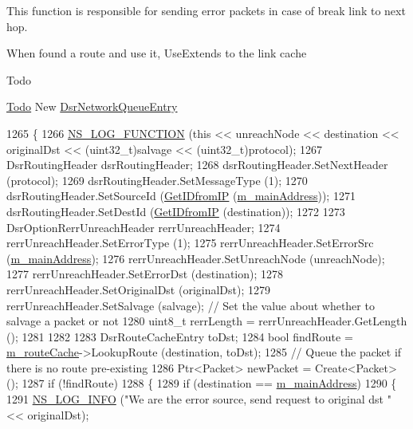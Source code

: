 This function is responsible for sending error packets in case of break link to next hop. 

When found a route and use it, Use\+Extends to the link cache

\begin{DoxyRefDesc}{Todo}
\item[\hyperlink{todo__todo000023}{Todo}]New \hyperlink{classns3_1_1dsr_1_1DsrNetworkQueueEntry}{Dsr\+Network\+Queue\+Entry} \end{DoxyRefDesc}

\begin{DoxyCode}
1265 \{
1266   \hyperlink{log-macros-disabled_8h_a90b90d5bad1f39cb1b64923ea94c0761}{NS\_LOG\_FUNCTION} (\textcolor{keyword}{this} << unreachNode << destination << originalDst << (uint32\_t)salvage <<
       (uint32\_t)protocol);
1267   DsrRoutingHeader dsrRoutingHeader;
1268   dsrRoutingHeader.SetNextHeader (protocol);
1269   dsrRoutingHeader.SetMessageType (1);
1270   dsrRoutingHeader.SetSourceId (\hyperlink{classns3_1_1dsr_1_1DsrRouting_a4593e50d5f36e9b9b013fe0422067c44}{GetIDfromIP} (\hyperlink{classns3_1_1dsr_1_1DsrRouting_a73182b5edee2d8460f28855e058fc9a0}{m\_mainAddress}));
1271   dsrRoutingHeader.SetDestId (\hyperlink{classns3_1_1dsr_1_1DsrRouting_a4593e50d5f36e9b9b013fe0422067c44}{GetIDfromIP} (destination));
1272 
1273   DsrOptionRerrUnreachHeader rerrUnreachHeader;
1274   rerrUnreachHeader.SetErrorType (1);
1275   rerrUnreachHeader.SetErrorSrc (\hyperlink{classns3_1_1dsr_1_1DsrRouting_a73182b5edee2d8460f28855e058fc9a0}{m\_mainAddress});
1276   rerrUnreachHeader.SetUnreachNode (unreachNode);
1277   rerrUnreachHeader.SetErrorDst (destination);
1278   rerrUnreachHeader.SetOriginalDst (originalDst);
1279   rerrUnreachHeader.SetSalvage (salvage);                       \textcolor{comment}{// Set the value about whether to salvage a
       packet or not}
1280   uint8\_t rerrLength = rerrUnreachHeader.GetLength ();
1281 
1282 
1283   DsrRouteCacheEntry toDst;
1284   \textcolor{keywordtype}{bool} findRoute = \hyperlink{classns3_1_1dsr_1_1DsrRouting_ac409bdb961b9fff0fb63ebd026be99ad}{m\_routeCache}->LookupRoute (destination, toDst);
1285   \textcolor{comment}{// Queue the packet if there is no route pre-existing}
1286   Ptr<Packet> newPacket = Create<Packet> ();
1287   \textcolor{keywordflow}{if} (!findRoute)
1288     \{
1289       \textcolor{keywordflow}{if} (destination == \hyperlink{classns3_1_1dsr_1_1DsrRouting_a73182b5edee2d8460f28855e058fc9a0}{m\_mainAddress})
1290       \{
1291         \hyperlink{group__logging_gafbd73ee2cf9f26b319f49086d8e860fb}{NS\_LOG\_INFO} (\textcolor{stringliteral}{"We are the error source, send request to original dst "} << originalDst);

\end{DoxyCode}
